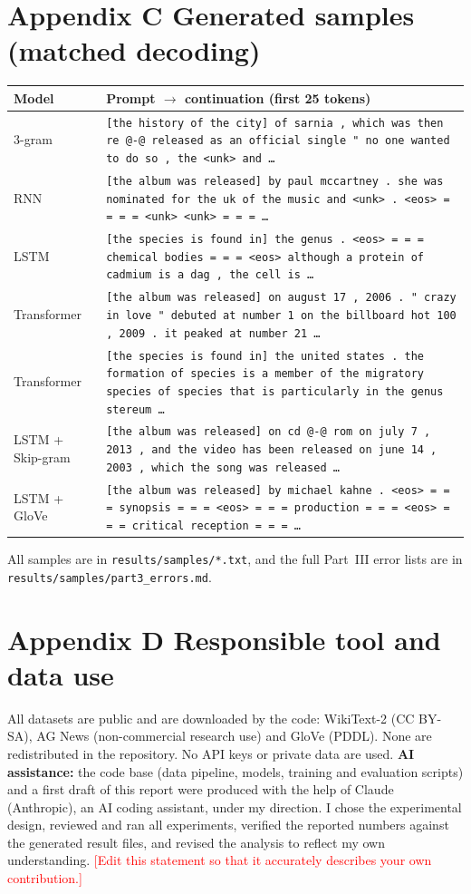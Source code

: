 \documentclass[10pt,a4paper]{article}
\begin{document}
\section*{Appendix C \quad Generated samples (matched decoding)}
\begin{table}[h]
\centering\footnotesize
\begin{tabularx}{\linewidth}{@{}l>{\raggedright\arraybackslash}X@{}}
\toprule
Model & Prompt $\to$ continuation (first 25 tokens) \\
\midrule
3-gram & \texttt{[the history of the city] of sarnia , which was then re @-@ released as an official single " no one wanted to do so , the <unk> and \ldots} \\
RNN & \texttt{[the album was released] by paul mccartney . she was nominated for the uk of the music and <unk> . <eos> = = = = <unk> <unk> = = = \ldots} \\
LSTM & \texttt{[the species is found in] the genus . <eos> = = = chemical bodies = = = <eos> although a protein of cadmium is a dag , the cell is \ldots} \\
Transformer & \texttt{[the album was released] on august 17 , 2006 . " crazy in love " debuted at number 1 on the billboard hot 100 , 2009 . it peaked at number 21 \ldots} \\
Transformer & \texttt{[the species is found in] the united states . the formation of species is a member of the migratory species of species that is particularly in the genus stereum \ldots} \\
LSTM + Skip-gram & \texttt{[the album was released] on cd @-@ rom on july 7 , 2013 , and the video has been released on june 14 , 2003 , which the song was released \ldots} \\
LSTM + GloVe & \texttt{[the album was released] by michael kahne . <eos> = = = synopsis = = = <eos> = = = production = = = <eos> = = = critical reception = = = \ldots} \\
\bottomrule
\end{tabularx}
\end{table}
{\small All samples are in \texttt{results/samples/*.txt}, and the full Part~III error lists are in \texttt{results/samples/part3\_errors.md}.}

\section*{Appendix D \quad Responsible tool and data use}
{\small All datasets are public and are downloaded by the code: WikiText-2 (CC BY-SA), AG News (non-commercial research use) and GloVe (PDDL). None are redistributed in the repository. No API keys or private data are used. \textbf{AI assistance:} the code base (data pipeline, models, training and evaluation scripts) and a first draft of this report were produced with the help of Claude (Anthropic), an AI coding assistant, under my direction. I chose the experimental design, reviewed and ran all experiments, verified the reported numbers against the generated result files, and revised the analysis to reflect my own understanding. \textcolor{red}{[Edit this statement so that it accurately describes your own contribution.]}}
\end{document}
